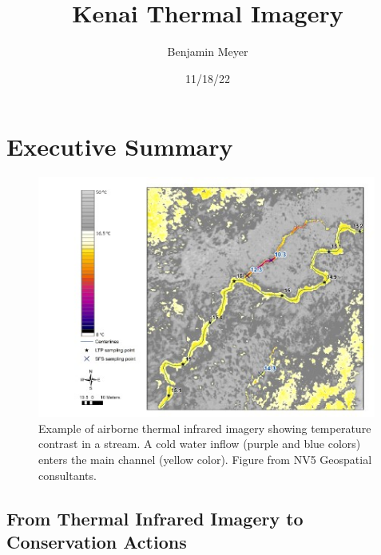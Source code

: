 \documentclass[
  letterpaper,
  DIV=11,
  numbers=noendperiod]{scrreprt}
\title{Kenai Thermal Imagery}
\author{Benjamin Meyer}
\date{11/18/22}
\renewcommand*\contentsname{Table of contents}
\newcommand\contentsname{Table of contents}
\begin{document}
\maketitle
\ifdefined\Shaded\renewenvironment{Shaded}{\begin{tcolorbox}[boxrule=0pt, borderline west={3pt}{0pt}{shadecolor}, enhanced, frame hidden, sharp corners, breakable, interior hidden]}{\end{tcolorbox}}\fi

\renewcommand*\contentsname{Table of contents}
{
\hypersetup{linkcolor=}
\setcounter{tocdepth}{2}
\tableofcontents
}

\hypertarget{executive-summary}{%
\chapter*{Executive Summary}\label{executive-summary}}


\begin{figure}

{\centering \includegraphics[width=\textwidth,height=3.125in]{./images/example_TIR_figure.jpg}

}

\caption{Example of airborne thermal infrared imagery showing
temperature contrast in a stream. A cold water inflow (purple and blue
colors) enters the main channel (yellow color). Figure from NV5
Geospatial consultants.}

\end{figure}

\hypertarget{from-thermal-infrared-imagery-to-conservation-actions}{%
\section*{From Thermal Infrared Imagery to Conservation
Actions}\label{from-thermal-infrared-imagery-to-conservation-actions}}
\end{document}
